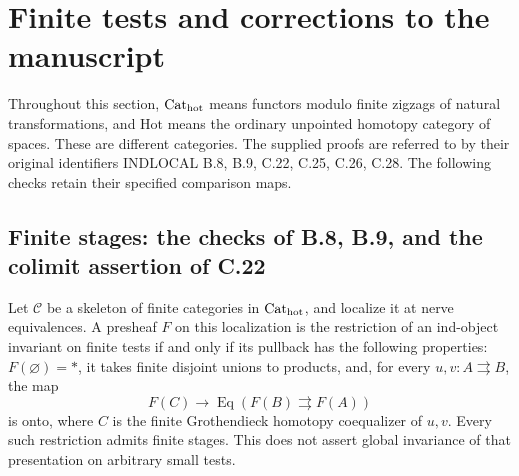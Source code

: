 \section{Finite tests and corrections to the manuscript}\label{sec:F}
Throughout this section, $\mathrm {Cat}_{\mathrm{hot}}$ means functors modulo finite
zigzags of natural transformations, and $\mathrm{Hot}$ means the ordinary
unpointed homotopy category of spaces. These are different categories.
The supplied proofs are referred to by their original identifiers
\textsc{INDLOCAL} B.8, B.9, C.22, C.25, C.26, C.28. The following checks
retain their specified comparison maps.

\subsection{Finite stages: the checks of B.8, B.9, and the colimit assertion of C.22}
\begin{proposition}\label{F:B8}
Let $\mathcal C$ be a skeleton of finite categories in
$\mathrm {Cat}_{\mathrm{hot}}$, and localize it at nerve equivalences. A presheaf
$F$ on this localization is the restriction of an ind-object invariant
on finite tests if and only if its pullback has the following properties:
$F(\varnothing)=*$, it takes finite disjoint unions to products, and,
for every $u,v:A\rightrightarrows B$, the map
\[
 F(C)\longrightarrow\operatorname{Eq}(F(B)\rightrightarrows F(A))
\]
is onto, where $C$ is the finite Grothendieck homotopy coequalizer of
$u,v$. Every such restriction admits finite stages. This does not assert
global invariance of that presentation on arbitrary small tests.
\end{proposition}
